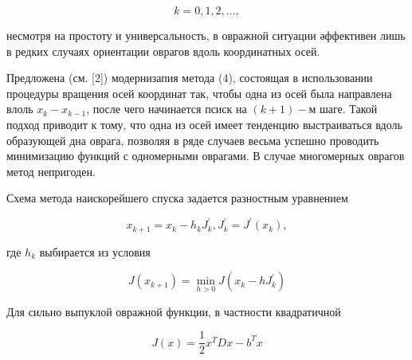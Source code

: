 \documentclass[10pt]{article}
\begin{document}
\[

k=0,1,2, \ldots,

\]



несмотря на простоту и универсальность, в овражной ситуации әффективен лишь в редких случаях ориентации оврагов вдоль координатных осей.



Предложена (см. [2]) модернизапия метода (4), состоящая в использовании процедуры вращения осей координат так, чтобы одна из осей была направлена влоль $x_{k}-x_{k-1}$, после чего начинается псиск на $(k+1)-м$ шаге. Такой подход приводит к тому, что одна из осей имеет тенденцию выстраиваться вдоль образующей дна оврага, позволяя в ряде случаев весьма успешно проводить минимизацию функций с одномерными оврагами. В случае многомерных оврагов метод непригоден.



Схема метода наискорейшего спуска задается разностным уравнением



\[

x_{k+1}=x_{k}-h_{k} J_{k}^{\prime}, J_{k}^{\prime}=J^{\prime}\left(x_{k}\right),

\]



где $h_{k}$ выбирается из условия



\[

J\left(x_{k+1}\right)=\min _{h>0} J\left(x_{k}-h J_{k}^{\prime}\right)

\]



Для сильно выпуклой овражной функции, в частности квадратичной



\[

J(x)=\frac{1}{2} x^{T} D x-b^{T} x

\]
\end{document}
